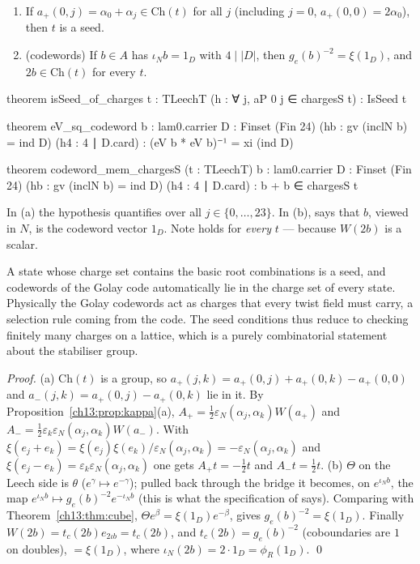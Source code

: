 \begin{proposition}\label{ch13:prop:charges}
\begin{enumerate}[label=(\alph*)]
\item If $a_+(0,j)=\alpha_0+\alpha_j\in\mathrm{Ch}(t)$ for all $j$ (including $j=0$, $a_+(0,0)=2\alpha_0$), then $t$ is a seed.
\item (codewords) If $b\in A$ has $\iota_Nb=1_D$ with $4\mid|D|$, then $g_e(b)^{-2}=\xi(1_D)$, and $2b\in\mathrm{Ch}(t)$ for
  every $t$.
\end{enumerate}
\end{proposition}
\begin{leancode}
theorem isSeed_of_charges {t : TLeechT} (h : ∀ j, aP 0 j ∈ chargesS t) : IsSeed t

theorem eV_sq_codeword {b : lam0.carrier} {D : Finset (Fin 24)} (hb : gv (inclN b) = ind D)
    (h4 : 4 ∣ D.card) : (eV b * eV b)⁻¹ = xi (ind D)

theorem codeword_mem_chargesS (t : TLeechT) {b : lam0.carrier} {D : Finset (Fin 24)}
    (hb : gv (inclN b) = ind D) (h4 : 4 ∣ D.card) : b + b ∈ chargesS t
\end{leancode}
\begin{dictionary}
In (a) the hypothesis quantifies over all $j\in\{0,\dots,23\}$. In (b), 
says that $b$, viewed in $N$, is the codeword vector $1_D$. Note  holds for
\emph{every} $t$ --- because $W(2b)$ is a scalar.
\end{dictionary}
\begin{physics}
A state whose charge set contains the basic root combinations is a seed, and codewords of the Golay code automatically lie in the charge set of every state. Physically the Golay codewords act as charges that every twist field must carry, a selection rule coming from the code. The seed conditions thus reduce to checking finitely many charges on a lattice, which is a purely combinatorial statement about the stabiliser group.
\end{physics}
\noindent\emph{Proof.} (a) $\mathrm{Ch}(t)$ is a group, so $a_+(j,k)=a_+(0,j)+a_+(0,k)-a_+(0,0)$ and
$a_-(j,k)=a_+(0,j)-a_+(0,k)$ lie in it. By Proposition~\ref{ch13:prop:kappa}(a),
$A_+=\tfrac12\varepsilon_N(\alpha_j,\alpha_k)W(a_+)$ and $A_-=\tfrac12\varepsilon_k\varepsilon_N(\alpha_j,\alpha_k)W(a_-)$. With
$\xi(e_j+e_k)=\xi(e_j)\xi(e_k)/\varepsilon_N(\alpha_j,\alpha_k)=-\varepsilon_N(\alpha_j,\alpha_k)$ and
$\xi(e_j-e_k)=\varepsilon_k\varepsilon_N(\alpha_j,\alpha_k)$ one gets $A_+t=-\tfrac12t$ and $A_-t=\tfrac12t$.
(b) $\Theta$ on the Leech side is $\theta$ ($e^\gamma\mapsto e^{-\gamma}$); pulled back through the bridge it becomes, on
$e^{\iota_N b}$, the map $e^{\iota_Nb}\mapsto g_e(b)^{-2}e^{-\iota_Nb}$ (this is what the specification of
 says). Comparing with Theorem~\ref{ch13:thm:cube}, $\Theta e^\beta=\xi(1_D)e^{-\beta}$, gives
$g_e(b)^{-2}=\xi(1_D)$. Finally $W(2b)=t_c(2b)e_{2\iota b}=t_c(2b)$, and $t_c(2b)=g_e(b)^{-2}$ (coboundaries are $1$
on doubles), $=\xi(1_D)$, where $\iota_N(2b)=2\cdot1_D=\phi_R(1_D)$. \qed

